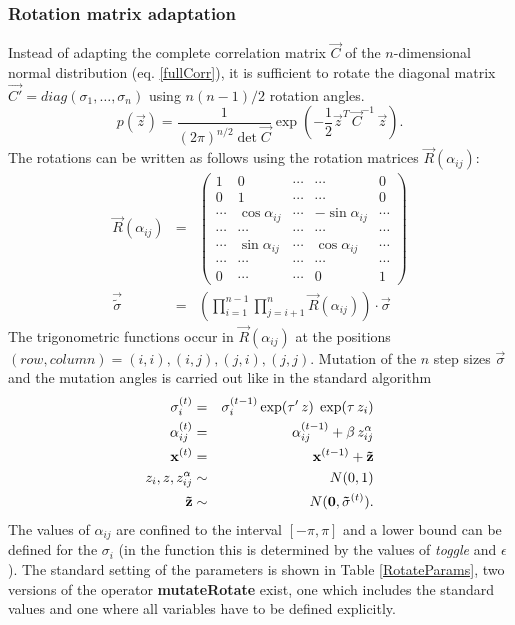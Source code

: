 \subsubsection{Rotation matrix adaptation}
\label{ss:rotate}
Instead of adapting the complete correlation matrix $\vec{C}$ of the
$n$-dimensional normal distribution (eq. \ref{fullCorr}), 
it is sufficient to rotate the diagonal matrix 
$\vec{C'}=diag(\sigma_1,\ldots,\sigma_n)$ using $n(n-1)/2$ rotation angles.
\begin{equation}
\label{fullCorr}
p(\vec{z}) = \frac{1}{(2\pi)^{n/2} \det \vec{C}}
\exp\left(-\frac{1}{2}\vec{z}^T\,\vec{C}^{-1}\,\vec{z}\right).
\end{equation}
The rotations can be written as follows using the rotation matrices
$\vec{R}(\alpha_{ij})$:
\begin{eqnarray}
\vec{R}(\alpha_{ij}) & = & \left( \begin{array}{ccccc}
1 & 0 & \cdots & \cdots &  0 \\
0 & 1 & \cdots & \cdots &  0 \\
\cdots & \cos \alpha_{ij} & \cdots & - \sin \alpha_{ij} & \cdots\\
\cdots & \cdots & \cdots & \cdots &  \cdots \\
\cdots & \sin \alpha_{ij} & \cdots & \cos \alpha_{ij} & \cdots\\
\cdots & \cdots & \cdots & \cdots &  \cdots \\
0 & \cdots & \cdots & 0 & 1
\end{array}\right)\\
\vec{{\tilde \sigma}} & = & \left( \prod^{n-1}_{i=1}\prod_{j=i+1}^{n}
\vec{R}(\alpha_{ij}) \right) \cdot \vec{\sigma}
\end{eqnarray}
The trigonometric functions occur in $\vec{R}(\alpha_{ij})$ at the
positions $(row, column) =(i,i), (i,j), (j,i), (j,j).$
Mutation of the $n$ step sizes $\vec{\sigma}$ and the mutation angles
is carried out like in the standard algorithm
\begin{eqnarray}
\sigma_i^{(t)} & = & \sigma_i^{(t-1)} \exp( \tau' \, z) \; \exp( \tau \,z_i)\\
\alpha_{ij}^{(t)} & = & \alpha_{ij}^{(t-1)} + \beta \,z^{\alpha}_{ij}\\
\mathbf{x}^{(t)} & = & \mathbf{x}^{(t-1)} + \mathbf{\tilde z}\\
z_i, z, z^{\alpha}_{ij} & \sim & N(0,1)\\
\mathbf{\tilde z}& \sim & N(\mathbf{0}, \mathbf{{\tilde \sigma}}^{(t)}).
\end{eqnarray}
The values of $\alpha_{ij}$ are confined to the interval $[-\pi,\pi]$
and a lower bound can be defined for the $\sigma_i$ (in the function
this is determined by the values of {\em toggle} and $\epsilon$).
The standard setting of the parameters is shown in Table 
\ref{RotateParams}, two
versions of the operator {\sffamily\bfseries\small mutateRotate}
exist, one which includes the standard values and one where all
variables have to be defined explicitly. 



